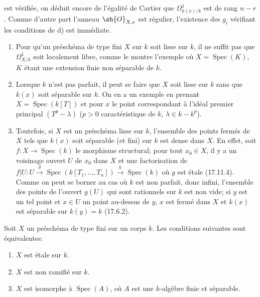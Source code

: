 
est vérifiée, on déduit encore de l'égalité de Cartier que $\Omega^1_{k(x)/k}$ est de rang $n-r$. Comme d'autre part l'anneau $\sh{O}_{X,x}$ est régulier, l'existence des $g_i$ vérifiant les conditions de d) est immédiate.

\begin{remarks}[17.15.10]
\label{IV.17.15.10}
\begin{enumerate}
  \item[(i)] Pour qu'un préschéma de type fini $X$ sur $k$ soit lisse sur $k$, il ne suffit pas que $\Omega^1_{X/k}$ soit localement libre, comme le montre l'exemple où $X=\operatorname{Spec}(K)$, $K$ étant une extension finie non séparable de $k$.
  \item[(ii)] Lorsque $k$ n'est pas parfait, il peut se faire que $X$ soit lisse sur $k$ sans que $k(x)$ soit séparable sur $k$. On en a un exemple en prenant $X=\operatorname{Spec}(k[T])$ et pour $x$ le point correspondant à l'idéal premier principal $(T^p-\lambda)$ ($p>0$ caractéristique de $k$, $\lambda\in k-k^p$).
  \item[(iii)] Toutefois, si $X$ est un préschéma lisse sur $k$, l'ensemble des points fermés de $X$ tels que $k(x)$ soit séparable (et fini) sur $k$ est dense dans $X$. En effet, soit $f:X\to\operatorname{Spec}(k)$ le morphisme structural; pour tout $x_0\in X$, il y a un voisinage ouvert $U$ de $x_0$ dans $X$ et une factorisation de $f|U:U\xrightarrow{g}\operatorname{Spec}(k[T_1,\ldots,T_n])\xrightarrow{h}\operatorname{Spec}(k)$ où $g$ est étale (17.11.4). Comme on peut se borner au cas où $k$ est non parfait, donc infini, l'ensemble des points de l'ouvert $g(U)$ qui sont rationnels sur $k$ est non vide; si $y$ est un tel point et $x\in U$ un point au-dessus de $y$, $x$ est fermé dans $X$ et $k(x)$ est séparable sur $k(y)=k$ (17.6.2).
\end{enumerate}
\end{remarks}

\begin{proposition}[17.15.11]
\label{IV.17.15.11}
Soit $X$ un préschéma de type fini sur un corps $k$. Les conditions suivantes sont équivalentes:
\begin{enumerate}
  \item[a)] $X$ est étale sur $k$.
  \item[b)] $X$ est non ramifié sur $k$.
  \item[c)] $X$ est isomorphe à $\operatorname{Spec}(A)$, où $A$ est une $k$-algèbre finie et séparable.
\end{enumerate}
\end{proposition}

